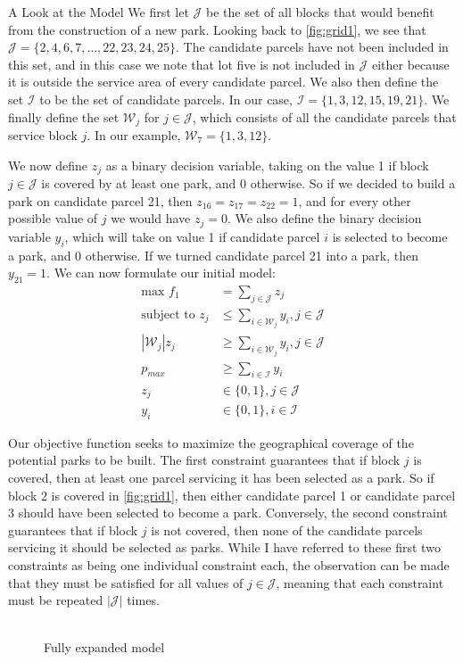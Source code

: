 \documentclass[12pt]{pom_thesis}
\theoremstyle{definition}
\begin{document}
\begin{chapter}{A Look at the Model}
	We first let $\mathcal{J}$ be the set of all blocks that would benefit from the construction of a new park. Looking back to \autoref{fig:grid1}, we see that $\mathcal{J} = \{ 2,4,6,7, \dots, 22, 23, 24, 25\}$. The candidate parcels have not been included in this set, and in this case we note that lot five is not included in $\mathcal{J}$ either because it is outside the service area of every candidate parcel. We also then define the set $\mathcal{I}$ to be the set of candidate parcels. In our case, $\mathcal{I} = \{ 1,3,12,15,19,21\}$. We finally define the set $\mathcal{W}_j$ for $j \in \mathcal{J}$, which consists of all the candidate parcels that service block $j$. In our example, $\mathcal{W}_7 = \{1,3,12\}$. \newline
	
	We now define $z_j$ as a binary decision variable, taking on the value 1 if block $j \in \mathcal{J}$ is covered by at least one park, and 0 otherwise. So if we decided to build a park on candidate parcel 21, then $z_{16} = z_{17} = z_{22} = 1$, and for every other possible value of $j$ we would have $z_j = 0$. We also define the binary decision variable $y_i$, which will take on value 1 if candidate parcel $i$ is selected to become a park, and 0 otherwise. If we turned candidate parcel 21 into a park, then $y_{21} = 1$. We can now formulate our initial model:
\begin{align*}
\textrm{max } f_1 &= \sum_{j \in \mathcal{J}} z_j \\
\textrm{subject to } z_j &\leq \sum_{i \in \mathcal{W}_j} y_i, j \in \mathcal{J}\\
\left|\mathcal{W}_j\right|z_j &\geq \sum_{i \in \mathcal{W}_j} y_i, j \in \mathcal{J} \\
p_{max} &\geq \sum_{i \in \mathcal{I}} y_i \\
z_j &\in \{0,1\}, j \in \mathcal{J} \\
y_i &\in \{0,1\}, i \in \mathcal{I}
\end{align*}

	Our objective function seeks to maximize the geographical coverage of the potential parks to be built. The first constraint guarantees that if block $j$ is covered, then at least one parcel servicing it has been selected as a park. So if block 2 is covered in \autoref{fig:grid1}, then either candidate parcel 1 or candidate parcel 3 should have been selected to become a park. Conversely, the second constraint guarantees that if block $j$ is not covered, then none of the candidate parcels servicing it should be selected as parks. While I have referred to these first two constraints as being one individual constraint each, the observation can be made that they must be satisfied for all values of $j \in \mathcal{J}$, meaning that each constraint must be repeated $|\mathcal{J}|$ times. \\ \\
	\begin{figure}
	\centering
	\caption{Fully expanded model}
	\label{expandedmodel}
	

\end{figure}
\end{chapter}
\end{document}
